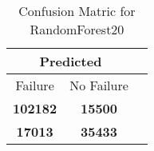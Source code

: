 \begin{table}[] 
\caption{Confusion Matric for RandomForest20} 
\label{Table: Prediction Accuracy-DMDRandomForest20OnlySunEKF-combinationReflection-Reflection} 
\centering 
\begin{tabular} 
 {@{}ccc@{}} 
\toprule 
\multicolumn{2}{c}{\textbf{Predicted}}
 \\ \midrule 
\multicolumn{1}{|c|}{Failure} & 
\multicolumn{1}{c|}{No Failure}
 \\ \midrule 
\multicolumn{1}{|c|}{\color{green}\textbf{102182}} & 
\multicolumn{1}{c|}{\color{red}\textbf{15500}}
 \\ \midrule 
\multicolumn{1}{|c|}{\color{red}\textbf{17013}} & 
\multicolumn{1}{c|}{\color{green}\textbf{35433}}
 \\ \bottomrule 
\end{tabular} 
\end{table} 
